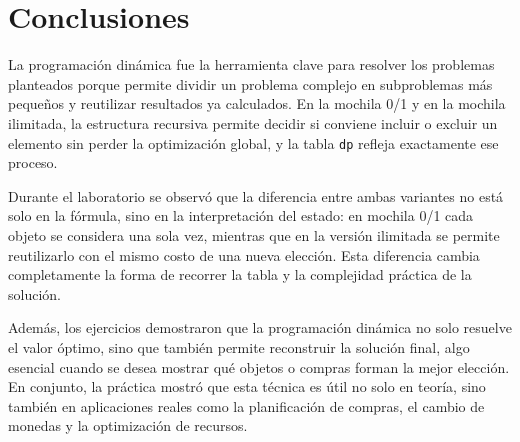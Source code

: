 \documentclass{article}
\begin{document}
\section{Conclusiones}

La programación dinámica fue la herramienta clave para resolver los problemas planteados porque permite dividir un problema complejo en subproblemas más pequeños y reutilizar resultados ya calculados. En la mochila 0/1 y en la mochila ilimitada, la estructura recursiva permite decidir si conviene incluir o excluir un elemento sin perder la optimización global, y la tabla \texttt{dp} refleja exactamente ese proceso.

Durante el laboratorio se observó que la diferencia entre ambas variantes no está solo en la fórmula, sino en la interpretación del estado: en mochila 0/1 cada objeto se considera una sola vez, mientras que en la versión ilimitada se permite reutilizarlo con el mismo costo de una nueva elección. Esta diferencia cambia completamente la forma de recorrer la tabla y la complejidad práctica de la solución.

Además, los ejercicios demostraron que la programación dinámica no solo resuelve el valor óptimo, sino que también permite reconstruir la solución final, algo esencial cuando se desea mostrar qué objetos o compras forman la mejor elección. En conjunto, la práctica mostró que esta técnica es útil no solo en teoría, sino también en aplicaciones reales como la planificación de compras, el cambio de monedas y la optimización de recursos.

	
	
    
%
%
%
			
\end{document}
